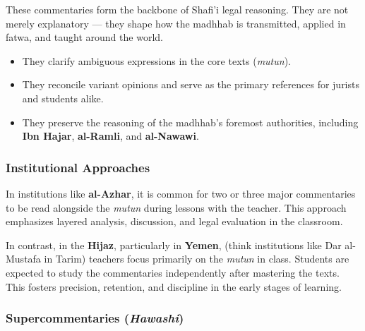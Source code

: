 \documentclass[
  a4paper,
  DIV=11,
  numbers=noendperiod]{scrartcl}
\providecommand{\tightlist}{%
  \setlength{\itemsep}{0pt}\setlength{\parskip}{0pt}}
\begin{document}
\begin{tcolorbox}[enhanced jigsaw, titlerule=0mm, opacitybacktitle=0.6, toptitle=1mm, opacityback=0, left=2mm, breakable, rightrule=.15mm, arc=.35mm, colframe=quarto-callout-important-color-frame, leftrule=.75mm, colback=white, colbacktitle=quarto-callout-important-color!10!white, coltitle=black, bottomtitle=1mm, title=\textcolor{quarto-callout-important-color}{\faExclamation}\hspace{0.5em}{Why These Commentaries Matter}, toprule=.15mm, bottomrule=.15mm]

These commentaries form the backbone of Shafi'i legal reasoning. They
are not merely explanatory --- they shape how the madhhab is
transmitted, applied in fatwa, and taught around the world.

\begin{itemize}
\tightlist
\item
  They clarify ambiguous expressions in the core texts (\emph{mutun}).
\item
  They reconcile variant opinions and serve as the primary references
  for jurists and students alike.
\item
  They preserve the reasoning of the madhhab's foremost authorities,
  including \textbf{Ibn Hajar}, \textbf{al-Ramli}, and
  \textbf{al-Nawawi}.
\end{itemize}

\subsubsection{Institutional Approaches}\label{institutional-approaches}

In institutions like \textbf{al-Azhar}, it is common for two or three
major commentaries to be read alongside the \emph{mutun} during lessons
with the teacher. This approach emphasizes layered analysis, discussion,
and legal evaluation in the classroom.

In contrast, in the \textbf{Hijaz}, particularly in \textbf{Yemen},
(think institutions like Dar al-Mustafa in Tarim) teachers focus
primarily on the \emph{mutun} in class. Students are expected to study
the commentaries independently after mastering the texts. This fosters
precision, retention, and discipline in the early stages of learning.

\end{tcolorbox}

\subsubsection{\texorpdfstring{Supercommentaries
(\emph{Hawashi})}{Supercommentaries (Hawashi)}}\label{supercommentaries-hawashi}
\end{document}
